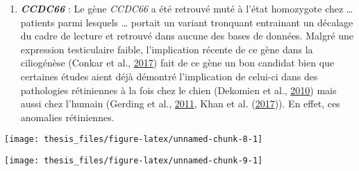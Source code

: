 \documentclass[12pt,twoside]{reedthesis}
\providecommand{\tightlist}{%
  \setlength{\itemsep}{0pt}\setlength{\parskip}{0pt}}
\theoremstyle{definition}
\theoremstyle{definition}
\theoremstyle{remark}
\begin{document}
  \begin{enumerate}
  \def\labelenumi{\arabic{enumi}.}
  \tightlist
  \item
    \textbf{\emph{CCDC66}} : Le gène \emph{CCDC66} a été retrouvé muté à
    l'état homozygote chez \ldots{} patients parmi lesquels \ldots{}
    portait un variant tronquant entrainant un décalage du cadre de
    lecture et retrouvé dans aucune des bases de données. Malgré une
    expression testiculaire faible, l'implication récente de ce gène dans
    la ciliogénèse (Conkar et al.,
    \protect\hyperlink{ref-Conkar2017}{2017}) fait de ce gène un bon
    candidat bien que certaines études aient déjà démontré l'implication
    de celui-ci dans des pathologies rétiniennes à la fois chez le chien
    (Dekomien et al., \protect\hyperlink{ref-Dekomien2010}{2010}) mais
    aussi chez l'humain (Gerding et al.,
    \protect\hyperlink{ref-Gerding2011}{2011}, Khan et al.
    (\protect\hyperlink{ref-Khan2017}{2017})). En effet, ces anomalies
    rétiniennes.
  \end{enumerate}
  
  \newpage
  
  \begin{center}\texttt{[image: thesis\_files/figure-latex/unnamed-chunk-8-1]} \end{center}
  
  \newpage
  
  \begin{center}\texttt{[image: thesis\_files/figure-latex/unnamed-chunk-9-1]} \end{center}
  
  \newpage
  
\end{document}
